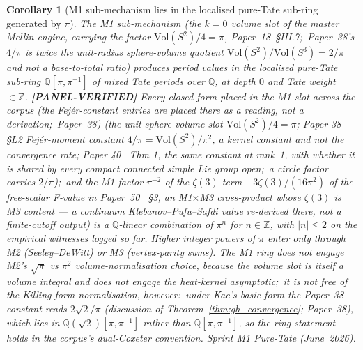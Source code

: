 \documentclass[11pt]{article}
\newtheorem{corollary}{Corollary}
\begin{document}
\begin{corollary}[M1 sub-mechanism lies in the localised pure-Tate
sub-ring generated by $\pi$]
\label{cor:m1_pure_tate}
The M1 sub-mechanism (the $k = 0$ volume slot of the master Mellin engine,
carrying the factor $\mathrm{Vol}(S^2)/4 = \pi$, Paper~18~\S III.7;\ Paper~38's $4/\pi$ is \emph{twice} the
unit-radius sphere-volume quotient $\mathrm{Vol}(S^2)/\mathrm{Vol}(S^3) =
2/\pi$ and not a base-to-total ratio)
produces period values in the localised pure-Tate sub-ring
$\mathbb{Q}[\pi, \pi^{-1}]$ of mixed Tate periods over $\mathbb{Q}$,
at depth $0$ and Tate weight $\in \mathbb{Z}$.  \textbf{[PANEL-VERIFIED]} Every closed form
placed in the M1 slot across the corpus (the Fej\'er-constant entries are placed
there as a reading, not a derivation;\ Paper~38) (the unit-sphere volume slot
$\mathrm{Vol}(S^2)/4 = \pi$; Paper 38 §L2 Fej\'er-moment constant
$4/\pi = \mathrm{Vol}(S^2)/\pi^2$, a kernel constant and not the convergence
rate; Paper 40~\cite{loutey_paper40} Thm 1, the same constant at rank~1,
with whether it is shared by every compact connected simple Lie group
open;\ a circle factor carries $2/\pi$);\ and the M1 factor $\pi^{-2}$ of the $\zeta(3)$ term $-3\zeta(3)/(16\pi^2)$ of the free-scalar F-value in Paper~50~\cite{loutey_paper50} §3,
an M1$\times$M3 cross-product whose $\zeta(3)$ is M3 content --- a continuum Klebanov--Pufu--Safdi value re-derived
there, not a finite-cutoff output) is a $\mathbb{Q}$-linear combination
of $\pi^n$ for $n \in \mathbb{Z}$, with $|n| \le 2$ on the empirical
witnesses logged so far.  Higher integer powers of $\pi$ enter only
through M2 (Seeley--DeWitt) or M3 (vertex-parity sums).  The M1 ring
does not engage M2's $\sqrt\pi$ vs $\pi^2$ volume-normalisation choice,
because the volume slot is itself a volume integral and does not engage
the heat-kernel asymptotic;\ it is \emph{not} free of the
Killing-form normalisation, however:\ under Kac's basic form the
Paper~38 constant reads $2\sqrt2/\pi$
(discussion of Theorem~\ref{thm:gh_convergence}; Paper~38), which lies in
$\mathbb{Q}(\sqrt2)[\pi, \pi^{-1}]$ rather than
$\mathbb{Q}[\pi, \pi^{-1}]$, so the ring statement holds in the
corpus's dual-Coxeter convention.
Sprint M1 Pure-Tate (June~2026).
\end{corollary}
\end{document}
